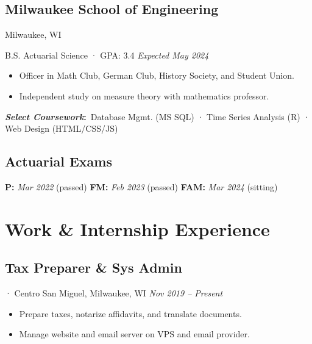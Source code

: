 \documentclass[12pt]{article}
\newcommand{\itemspace}{\vspace{0.3170em}}
\renewcommand{\textsc}[1]{\uppercase{\footnotesize#1}\normalsize}
\newcommand{\examgap}{\hspace{6.55em}}
\begin{document}
\subsection{Milwaukee School of Engineering} \hfill Milwaukee, WI

B.S. Actuarial Science · GPA: 3.4 \hfill \textit{Expected May 2024}

\begin{itemize}[noitemsep,nolistsep]
  \item Officer in Math Club, German Club, History Society, and Student Union.

  \item Independent study on measure theory with mathematics professor.
\end{itemize}

\textbf{\textit{Select Coursework}:} \,Database Mgmt. (\textsc{ms sql}) ·
Time Series Analysis (\textsc{R}) · Web Design (\textsc{html/css/js})

\itemspace

\subsection{Actuarial Exams} \hfill

\textbf{P:}\; \textit{Mar 2022} (passed)
\examgap
\textbf{FM:}\; \textit{Feb 2023} (passed)
\examgap
\textbf{FAM:}\; \textit{Mar 2024} (sitting)

\itemspace

\section{Work \& Internship Experience}

\subsection{Tax Preparer \& Sys Admin}
· Centro San Miguel, Milwaukee, WI \hfill \textit{Nov 2019 -- Present}

\begin{itemize}[noitemsep,nolistsep]
  \item Prepare taxes, notarize affidavits, and translate documents.

  \item Manage website and email server on VPS and email provider.
\end{itemize}
\end{document}
